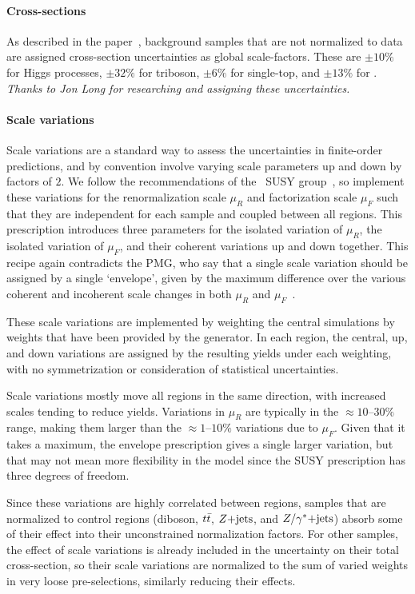 \paragraph{Cross-sections}
As described in the paper~\cite{atlas2022searches},
background samples that are not normalized to data are assigned cross-section
uncertainties as global scale-factors.
These are $\pm10\%$ for Higgs processes,
$\pm32\%$ for triboson,
$\pm6\%$ for single-top,
and $\pm13\%$ for \topother.
\emph{Thanks to Jon Long for researching and assigning these uncertainties.}

\paragraph{Scale variations}
Scale variations are a standard way to assess the uncertainties in finite-order
predictions, and by convention involve varying scale parameters up and down
by factors of $2$.
We follow the recommendations of the
\atlas\ SUSY group~\cite{atlas_twiki_susytheoretical}, so implement
these variations for the
renormalization scale $\mu_R$ and factorization scale $\mu_F$ such that they
are independent for each sample and coupled between all regions.
This prescription introduces three parameters for the isolated variation of
$\mu_R$, the isolated variation of $\mu_F$, and their coherent variations
up and down together.
This recipe again contradicts the PMG, who say
that a single scale variation should be assigned by a single `envelope',
given by the maximum difference over the various coherent and incoherent scale
changes in both $\mu_R$ and $\mu_F$~\cite{atlas_twiki_pmg_theory}.

These scale variations are implemented by weighting the central simulations
by weights that have been provided by the generator.
In each region, the central, up, and down variations are assigned by the
resulting yields under each weighting, with no symmetrization or
consideration of statistical uncertainties.

Scale variations mostly move all regions in the same direction, with increased
scales tending to reduce yields.
Variations in $\mu_R$ are typically in the $\approx 10\textrm{--}30\%$ range,
making them larger than the $\approx 1\textrm{--}10\%$ variations due to
$\mu_F$.
Given that it takes a maximum, the envelope prescription gives a single larger
variation, but that may not mean more flexibility in the model since the SUSY
prescription has three degrees of freedom.

Since these variations are highly correlated between regions, samples that are
normalized to control regions (diboson, $t\bar t$, $Z\mathrm{+jets}$, and $Z/\gamma^*\mathrm{+jets}$)
absorb some of their effect into their unconstrained normalization factors.
For other samples, the effect of scale variations is already included in
the uncertainty on their total cross-section, so their scale variations are
normalized to the sum of varied weights in very loose pre-selections,
similarly reducing their effects.

